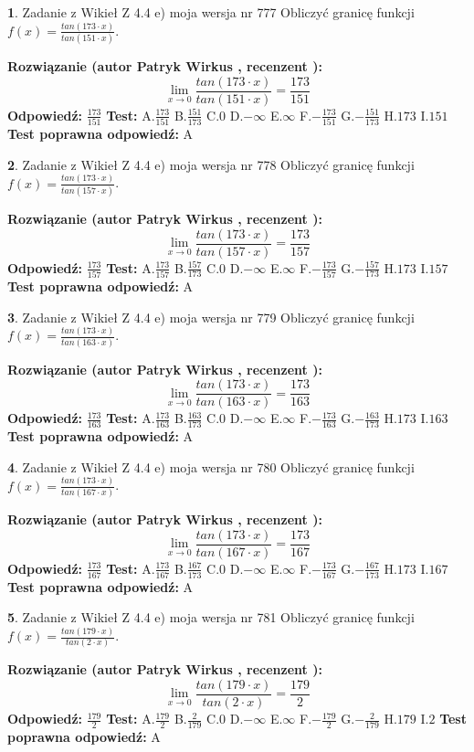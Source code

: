 \documentclass[12pt, a4paper]{article}
\theoremstyle{definition} %
\newtheorem{zad}{}
\newcommand{\zadStart}[1]{\begin{zad}#1\newline}
\newcommand{\zadStop}{\end{zad}}
\newcommand{\rozwStart}[2]{\noindent \textbf{Rozwiązanie (autor #1 , recenzent #2): }\newline}
\newcommand{\rozwStop}{\newline}
\newcommand{\odpStart}{\noindent \textbf{Odpowiedź:}\newline}
\newcommand{\odpStop}{\newline}
\newcommand{\testStart}{\noindent \textbf{Test:}\newline}
\newcommand{\testStop}{\newline}
\newcommand{\kluczStart}{\noindent \textbf{Test poprawna odpowiedź:}\newline}
\newcommand{\kluczStop}{\newline}
\begin{document}
\zadStart{Zadanie z Wikieł Z 4.4 e) moja wersja nr 777}
Obliczyć granicę funkcji $f(x)=\frac{tan(173\cdot x)}{tan(151\cdot x)}$.
\zadStop
\rozwStart{Patryk Wirkus}{}
$$\lim\limits_{x\to 0}\frac{tan(173\cdot x)}{tan(151\cdot x)}=
\frac{173}{151}$$
\rozwStop
\odpStart
$\frac{173}{151}$
\odpStop
\testStart
A.$\frac{173}{151}$
B.$\frac{151}{173}$
C.$0$
D.$-\infty$
E.$\infty$
F.$-\frac{173}{151}$
G.$-\frac{151}{173}$
H.$173$
I.$151$
\testStop
\kluczStart
A
\kluczStop



\zadStart{Zadanie z Wikieł Z 4.4 e) moja wersja nr 778}
Obliczyć granicę funkcji $f(x)=\frac{tan(173\cdot x)}{tan(157\cdot x)}$.
\zadStop
\rozwStart{Patryk Wirkus}{}
$$\lim\limits_{x\to 0}\frac{tan(173\cdot x)}{tan(157\cdot x)}=
\frac{173}{157}$$
\rozwStop
\odpStart
$\frac{173}{157}$
\odpStop
\testStart
A.$\frac{173}{157}$
B.$\frac{157}{173}$
C.$0$
D.$-\infty$
E.$\infty$
F.$-\frac{173}{157}$
G.$-\frac{157}{173}$
H.$173$
I.$157$
\testStop
\kluczStart
A
\kluczStop



\zadStart{Zadanie z Wikieł Z 4.4 e) moja wersja nr 779}
Obliczyć granicę funkcji $f(x)=\frac{tan(173\cdot x)}{tan(163\cdot x)}$.
\zadStop
\rozwStart{Patryk Wirkus}{}
$$\lim\limits_{x\to 0}\frac{tan(173\cdot x)}{tan(163\cdot x)}=
\frac{173}{163}$$
\rozwStop
\odpStart
$\frac{173}{163}$
\odpStop
\testStart
A.$\frac{173}{163}$
B.$\frac{163}{173}$
C.$0$
D.$-\infty$
E.$\infty$
F.$-\frac{173}{163}$
G.$-\frac{163}{173}$
H.$173$
I.$163$
\testStop
\kluczStart
A
\kluczStop



\zadStart{Zadanie z Wikieł Z 4.4 e) moja wersja nr 780}
Obliczyć granicę funkcji $f(x)=\frac{tan(173\cdot x)}{tan(167\cdot x)}$.
\zadStop
\rozwStart{Patryk Wirkus}{}
$$\lim\limits_{x\to 0}\frac{tan(173\cdot x)}{tan(167\cdot x)}=
\frac{173}{167}$$
\rozwStop
\odpStart
$\frac{173}{167}$
\odpStop
\testStart
A.$\frac{173}{167}$
B.$\frac{167}{173}$
C.$0$
D.$-\infty$
E.$\infty$
F.$-\frac{173}{167}$
G.$-\frac{167}{173}$
H.$173$
I.$167$
\testStop
\kluczStart
A
\kluczStop



\zadStart{Zadanie z Wikieł Z 4.4 e) moja wersja nr 781}
Obliczyć granicę funkcji $f(x)=\frac{tan(179\cdot x)}{tan(2\cdot x)}$.
\zadStop
\rozwStart{Patryk Wirkus}{}
$$\lim\limits_{x\to 0}\frac{tan(179\cdot x)}{tan(2\cdot x)}=
\frac{179}{2}$$
\rozwStop
\odpStart
$\frac{179}{2}$
\odpStop
\testStart
A.$\frac{179}{2}$
B.$\frac{2}{179}$
C.$0$
D.$-\infty$
E.$\infty$
F.$-\frac{179}{2}$
G.$-\frac{2}{179}$
H.$179$
I.$2$
\testStop
\kluczStart
A
\kluczStop
\end{document}
